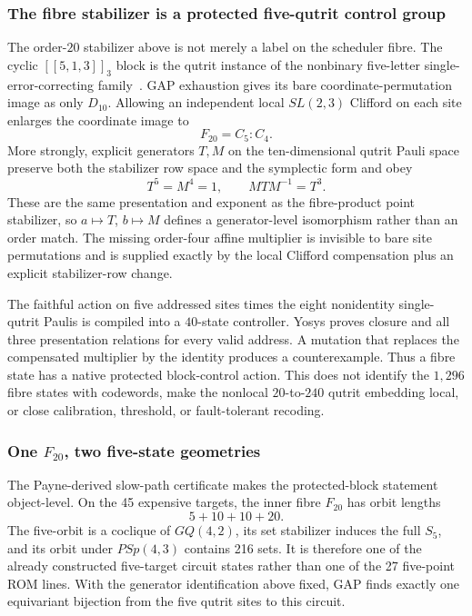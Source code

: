 \documentclass[11pt,letterpaper]{article}
\newcommand{\tagbox}[3]{\tikz[baseline=(X.base)]{\node[inner xsep=3.5pt,inner ysep=1.4pt,rounded corners=1.6pt,fill=#1,text=#2,font=\bfseries\sffamily\tiny] (X) {#3};}}
\newcommand{\PROVED}{\tagbox{greenlite}{green!45!black}{PROVED}}
\newcommand{\FORMAL}{\tagbox{cyanlite}{cyan!55!black}{FORMAL}}
\begin{document}
\subsubsection{The fibre stabilizer is a protected five-qutrit control group}

The order-$20$ stabilizer above is not merely a label on the scheduler fibre.
The cyclic $[[5,1,3]]_3$ block is the qutrit instance of the nonbinary
five-letter single-error-correcting family~\cite{rains1999nonbinary}. GAP
exhaustion gives its bare coordinate-permutation image as only $D_{10}$.
Allowing an independent local $SL(2,3)$ Clifford on each site enlarges the
coordinate image to
\[
 F_{20}=C_5{:}C_4.
\]
More strongly, explicit generators $T,M$ on the ten-dimensional qutrit Pauli
space preserve both the stabilizer row space and the symplectic form and obey
\[
 T^5=M^4=1,\qquad MTM^{-1}=T^3.
\]
These are the same presentation and exponent as the fibre-product point
stabilizer, so $a\mapsto T$, $b\mapsto M$ defines a generator-level
isomorphism rather than an order match. The missing order-four affine
multiplier is invisible to bare site permutations and is supplied exactly by
the local Clifford compensation plus an explicit stabilizer-row change.

The faithful action on five addressed sites times the eight nonidentity
single-qutrit Paulis is compiled into a $40$-state controller. Yosys proves
closure and all three presentation relations for every valid address. A
mutation that replaces the compensated multiplier by the identity produces a
counterexample. Thus a fibre state has a native protected block-control
action. This does not identify the $1,296$ fibre states with codewords, make
the nonlocal $20$-to-$240$ qutrit embedding local, or close calibration,
threshold, or fault-tolerant recoding. \PROVED\ \FORMAL

\subsubsection{One $F_{20}$, two five-state geometries}

The Payne-derived slow-path certificate makes the protected-block statement
object-level.  On the 45 expensive targets, the inner fibre $F_{20}$ has orbit
lengths
\[
 5+10+10+20.
\]
The five-orbit is a coclique of $GQ(4,2)$, its set stabilizer induces the full
$S_5$, and its orbit under $PSp(4,3)$ contains 216 sets.  It is therefore one
of the already constructed five-target circuit states rather than one of the
27 five-point ROM lines.  With the generator identification above fixed, GAP
finds exactly one equivariant bijection from the five qutrit sites to this
circuit.
\end{document}

